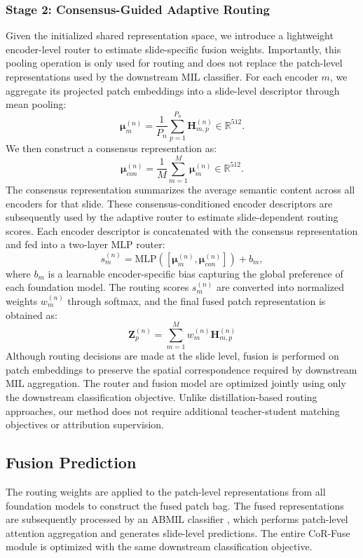 \subsubsection{Stage 2: Consensus-Guided Adaptive Routing}
Given the initialized shared representation space, we introduce a lightweight encoder-level router to estimate slide-specific fusion weights.
Importantly, this pooling operation is only used for routing and does not replace the patch-level representations used by the downstream MIL classifier.
For each encoder \(m\), we aggregate its projected patch embeddings into a slide-level descriptor through mean pooling:
\begin{equation}
\mathbf{\mu}_{m}^{(n)}
=
\frac{1}{P_n}\sum_{p=1}^{P_n}\mathbf H_{m,p}^{(n)}\in\mathbb R^{512}.
\end{equation}
We then construct a consensus representation as:
\begin{equation}
\mathbf{\mu}_{con}^{(n)}
=
\frac{1}{M}
\sum_{m=1}^{M}
\mathbf{\mu}_{m}^{(n)}
\in
\mathbb{R}^{512}.
\end{equation}
The consensus representation summarizes the average semantic content across all encoders for that slide.
These consensus-conditioned encoder descriptors are subsequently used by the adaptive router to estimate slide-dependent routing scores.
Each encoder descriptor is concatenated with the consensus representation and fed into a two-layer MLP router:
\begin{equation}
    s_m^{(n)}=
    \mathrm{MLP}
    ([\mathbf{\mu}_{m}^{(n)},\mathbf{\mu}_{con}^{(n)}])
    +b_m,
\end{equation}
where \(b_m\) is a learnable encoder-specific bias capturing the global preference of each foundation model.
The routing scores \(s_m^{(n)}\) are converted into normalized weights \(w_m^{(n)}\) through softmax, and the final fused patch representation is obtained as:
\begin{equation}
    \mathbf{Z}_p^{(n)}=
    \sum_{m=1}^{M}w_m^{(n)}\mathbf{H}_{m,p}^{(n)}
\end{equation}
Although routing decisions are made at the slide level, fusion is performed on patch embeddings to preserve the spatial correspondence required by downstream MIL aggregation.
The router and fusion model are optimized jointly using only the downstream classification objective.
Unlike distillation-based routing approaches, our method does not require additional teacher-student matching objectives or attribution supervision.
\subsection{Fusion Prediction}
The routing weights are applied to the patch-level representations from all foundation models to construct the fused patch bag.
The fused representations are subsequently processed by an ABMIL classifier \citep{ilse2018abmil}, which performs patch-level attention aggregation and generates slide-level predictions.
The entire CoR-Fuse module is optimized with the same downstream classification objective.
